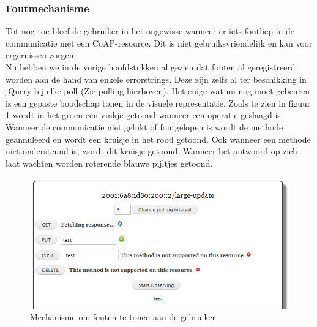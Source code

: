 \subsubsection{Foutmechanisme} \label{foutmechanisme}
Tot nog toe bleef de gebruiker in het ongewisse wanneer er iets foutliep in de communicatie met een CoAP-resource. Dit is niet gebruiksvriendelijk en kan voor ergernissen zorgen.\\
Nu hebben we in de vorige hoofdstukken al gezien dat fouten al geregistreerd worden aan de hand van enkele errorstrings. Deze zijn zelfs al ter beschikking in jQuery bij elke poll (Zie polling hierboven). Het enige wat nu nog moet gebeuren is een gepaste boodschap tonen in de visuele representatie. Zoals te zien in figuur \ref{fig:foutmechanisme} wordt in het groen een vinkje getoond wanneer een operatie geslaagd is. Wanneer de communicatie niet gelukt of foutgelopen is wordt de methode geannuleerd en wordt een kruisje in het rood getoond. Ook wanneer een methode niet ondersteund is, wordt dit kruisje getoond. Wanneer het antwoord op zich laat wachten worden roterende blauwe pijltjes getoond.

\begin{figure}[h!]
\centering
\includegraphics[width=1\textwidth]{fig/foutmechanisme}
\caption{Mechanisme om fouten te tonen aan de gebruiker}
\label{fig:foutmechanisme}
\end{figure}

\newpage
